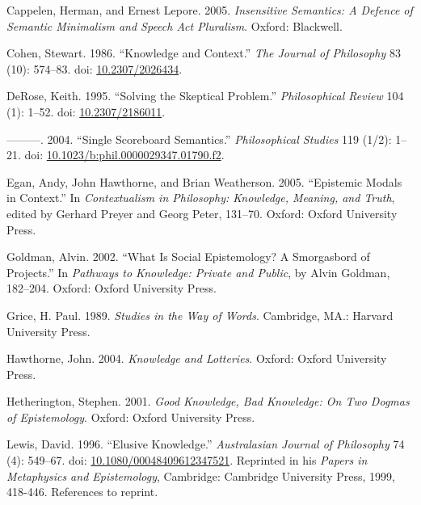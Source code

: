 \documentclass[
  11pt,
  letterpaper,
  DIV=11,
  numbers=noendperiod,
  twoside]{scrartcl}
\newlength{\cslhangindent}
\newenvironment{CSLReferences}[2] %
 {\begin{list}{}{%
  \setlength{\itemindent}{0pt}
  \setlength{\leftmargin}{0pt}
  \setlength{\parsep}{0pt}
  \ifodd #1
   \setlength{\leftmargin}{\cslhangindent}
   \setlength{\itemindent}{-1\cslhangindent}
  \fi
  \setlength{\itemsep}{#2\baselineskip}}}
 {\end{list}}
\begin{document}
\label{refs}
\begin{CSLReferences}{1}{0}
Cappelen, Herman, and Ernest Lepore. 2005. \emph{Insensitive Semantics:
A Defence of Semantic Minimalism and Speech Act Pluralism}. Oxford:
Blackwell.

Cohen, Stewart. 1986. {``Knowledge and Context.''} \emph{The Journal of
Philosophy} 83 (10): 574--83. doi:
\href{https://doi.org/10.2307/2026434}{10.2307/2026434}.

DeRose, Keith. 1995. {``Solving the Skeptical Problem.''}
\emph{Philosophical Review} 104 (1): 1--52. doi:
\href{https://doi.org/10.2307/2186011}{10.2307/2186011}.

---------. 2004. {``Single Scoreboard Semantics.''} \emph{Philosophical
Studies} 119 (1/2): 1--21. doi:
\href{https://doi.org/10.1023/b:phil.0000029347.01790.f2}{10.1023/b:phil.0000029347.01790.f2}.

Egan, Andy, John Hawthorne, and Brian Weatherson. 2005. {``{Epistemic
Modals in Context}.''} In \emph{Contextualism in Philosophy: Knowledge,
Meaning, and Truth}, edited by Gerhard Preyer and Georg Peter, 131--70.
Oxford: Oxford University Press.

Goldman, Alvin. 2002. {``What Is Social Epistemology? A Smorgasbord of
Projects.''} In \emph{Pathways to Knowledge: Private and Public}, by
Alvin Goldman, 182--204. Oxford: Oxford University Press.

Grice, H. Paul. 1989. \emph{Studies in the Way of Words}. Cambridge,
MA.: Harvard University Press.

Hawthorne, John. 2004. \emph{Knowledge and Lotteries}. Oxford: Oxford
University Press.

Hetherington, Stephen. 2001. \emph{Good Knowledge, Bad Knowledge: On Two
Dogmas of Epistemology}. Oxford: Oxford University Press.

Lewis, David. 1996. {``Elusive Knowledge.''} \emph{Australasian Journal
of Philosophy} 74 (4): 549--67. doi:
\href{https://doi.org/10.1080/00048409612347521}{10.1080/00048409612347521}.
Reprinted in his \emph{Papers in Metaphysics and Epistemology},
Cambridge: Cambridge University Press, 1999, 418-446. References to
reprint.


\end{CSLReferences}
\end{document}
